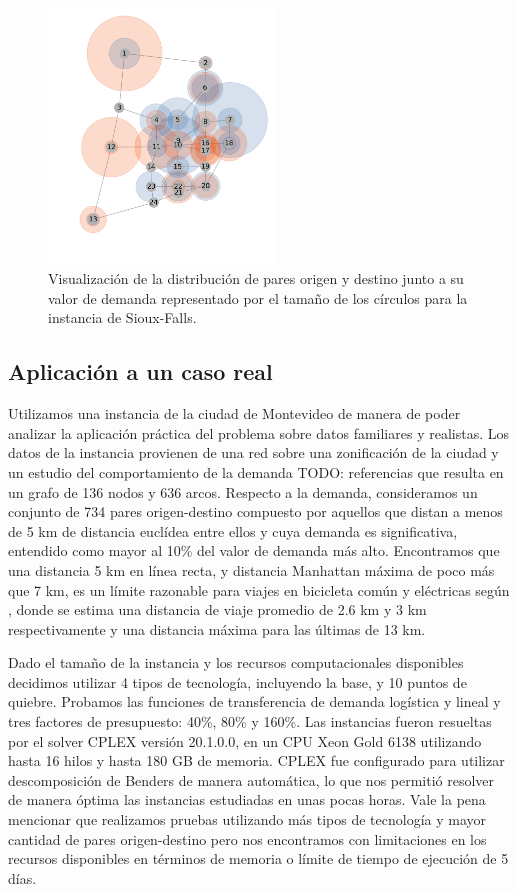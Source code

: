 \documentclass{article}
\begin{document}
  \begin{figure}[h!]
    \centering
    \includegraphics[width=6cm]{../resources/sioux_falls_demand.png}
    \caption{Visualización de la distribución de pares origen y destino junto a su valor de demanda representado por el tamaño de los círculos para la instancia de Sioux-Falls.}
    \label{fig:sioux_falls_demand}
  \end{figure}

  \FloatBarrier
  \subsection{Aplicación a un caso real}

   Utilizamos una instancia de la ciudad de Montevideo de manera de poder analizar la aplicación práctica del problema sobre datos familiares y realistas. Los datos de la instancia provienen de una red sobre una zonificación de la ciudad y un estudio del comportamiento de la demanda TODO: referencias que resulta en un grafo de 136 nodos y 636 arcos. Respecto a la demanda, consideramos un conjunto de 734 pares origen-destino compuesto por aquellos que distan a menos de 5 km de distancia euclídea entre ellos y cuya demanda es significativa, entendido como mayor al 10\% del valor de demanda más alto. Encontramos que una distancia 5 km en línea recta, y distancia Manhattan máxima de poco más que 7 km, es un límite razonable para viajes en bicicleta común y eléctricas según \cite{anette2018}, donde se estima una distancia de viaje promedio de 2.6 km y 3 km respectivamente y una distancia máxima para las últimas de 13 km.

  Dado el tamaño de la instancia y los recursos computacionales disponibles decidimos utilizar 4 tipos de tecnología, incluyendo la base, y 10 puntos de quiebre. Probamos las funciones de transferencia de demanda logística y lineal y tres factores de presupuesto: 40\%, 80\% y 160\%. Las instancias fueron resueltas por el solver CPLEX versión 20.1.0.0, en un CPU Xeon Gold 6138 utilizando hasta 16 hilos y hasta 180 GB de memoria. CPLEX fue configurado para utilizar descomposición de Benders de manera automática, lo que nos permitió resolver de manera óptima las instancias estudiadas en unas pocas horas. Vale la pena mencionar que realizamos pruebas utilizando más tipos de tecnología y mayor cantidad de pares origen-destino pero nos encontramos con limitaciones en los recursos disponibles en términos de memoria o límite de tiempo de ejecución de 5 días.
\end{document}
